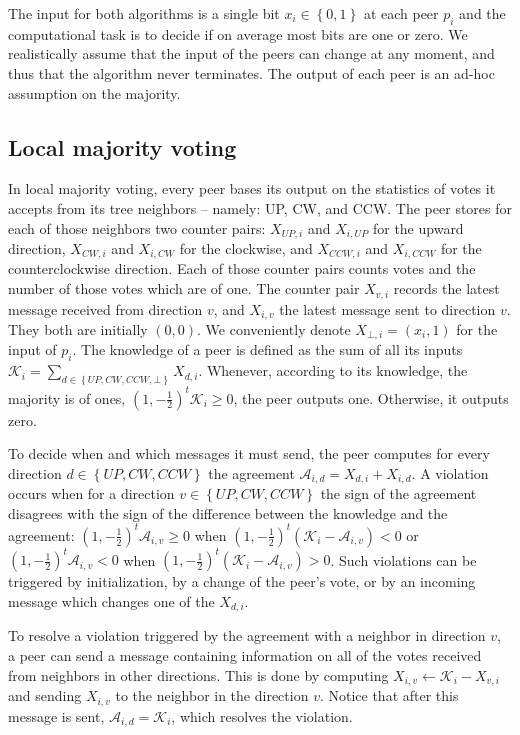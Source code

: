 \documentclass[12pt,english,journal]{elsarticle}
\numberwithin{equation}{section}
\numberwithin{figure}{section}
\theoremstyle{plain}
\theoremstyle{plain}
\begin{document}
The input for both algorithms is a single bit $x_{i}\in\left\{ 0,1\right\} $
at each peer $p_{i}$ and the computational task is to decide if on
average most bits are one or zero. We realistically assume that the
input of the peers can change at any moment, and thus that the algorithm
never terminates. The output of each peer is an ad-hoc assumption
on the majority.


\subsection{Local majority voting}

In local majority voting, every peer bases its output on the statistics
of votes it accepts from its tree neighbors -- namely: UP, CW, and
CCW. The peer stores for each of those neighbors two counter pairs:
$X_{UP,i}$ and $X_{i,UP}$ for the upward direction, $X_{CW,i}$
and $X_{i,CW}$ for the clockwise, and $X_{CCW,i}$ and $X_{i,CCW}$
for the counterclockwise direction. Each of those counter pairs counts
votes and the number of those votes which are of one. The counter
pair $X_{v,i}$ records the latest message received from direction
$v$, and $X_{i,v}$ the latest message sent to direction $v$. They
both are initially $\left(0,0\right)$. We conveniently denote $X_{\bot,i}=\left(x_{i},1\right)$
for the input of $p_{i}$. The knowledge of a peer is defined as the
sum of all its inputs $\mathcal{K}_{i}=\sum_{d\in\left\{ UP,CW,CCW,\bot\right\} }X_{d,i}$.
Whenever, according to its knowledge, the majority is of ones, $\left(1,-\frac{1}{2}\right)^{t}\mathcal{K}_{i}\geq0$,
the peer outputs one. Otherwise, it outputs zero.

To decide when and which messages it must send, the peer computes
for every direction $d\in\left\{ UP,CW,CCW\right\} $ the agreement
$\mathcal{A}_{i,d}=X_{d,i}+X_{i,d}$. A violation occurs when for
a direction $v\in\left\{ UP,CW,CCW\right\} $ the sign of the agreement
disagrees with the sign of the difference between the knowledge and
the agreement: $\left(1,-\frac{1}{2}\right)^{t}\mathcal{A}_{i,v}\geq0$
when $\left(1,-\frac{1}{2}\right)^{t}\left(\mathcal{K}_{i}-\mathcal{A}_{i,v}\right)<0$
or $\left(1,-\frac{1}{2}\right)^{t}\mathcal{A}_{i,v}<0$ when $\left(1,-\frac{1}{2}\right)^{t}\left(\mathcal{K}_{i}-\mathcal{A}_{i,v}\right)>0$.
Such violations can be triggered by initialization, by a change of
the peer's vote, or by an incoming message which changes one of the
$X_{d,i}$. 

To resolve a violation triggered by the agreement with a neighbor
in direction $v$, a peer can send a message containing information
on all of the votes received from neighbors in other directions. This
is done by computing $X_{i,v}\leftarrow\mathcal{K}_{i}-X_{v,i}$ and
sending $X_{i,v}$ to the neighbor in the direction $v$. Notice that
after this message is sent, $\mathcal{A}_{i,d}=\mathcal{K}_{i}$,
which resolves the violation.
\end{document}
